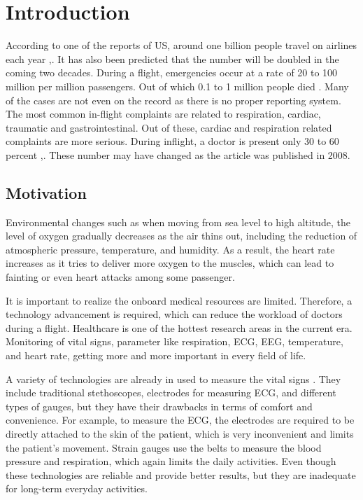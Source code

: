 \chapter{Introduction}

According to one of the reports of US, around one billion people travel on airlines each year \cite{PMC2577402},\cite{aerospace2003medical}. It has also been predicted that the number will be doubled in the coming two decades. During a flight, emergencies occur at a rate of 20 to 100 million per million passengers. Out of which 0.1 to 1 million people died \cite{lyznicki2000inflight}. Many of the cases are not even on the record as there is no proper reporting system. The most common in-flight complaints are related to respiration, cardiac, traumatic and gastrointestinal. Out of these, cardiac and respiration related complaints are more serious. During inflight, a doctor is present only 30 to 60 percent \cite{PMC2577402},\cite{PMC1119071}. These number may have changed as the article was published in 2008.


\section{Motivation}

Environmental changes such as when moving from sea level to high altitude, the level of oxygen gradually decreases as the air thins out, including the reduction of atmospheric pressure, temperature, and humidity. As a result, the heart rate increases as it tries to deliver more oxygen to the muscles, which can lead to fainting or even heart attacks among some passenger.

It is important to realize the onboard medical resources are limited. Therefore, a technology advancement is required, which can reduce the workload of doctors during a flight. Healthcare is one of the hottest research areas in the current era. Monitoring of vital signs, parameter like respiration, ECG, EEG, temperature, and heart rate, getting more and more important in every field of life.

A variety of technologies are already in used to measure the vital signs \cite{naturectlesshcs}. They include traditional stethoscopes, electrodes for measuring ECG, and different types of gauges, but they have their drawbacks in terms of comfort and convenience. For example, to measure the ECG, the electrodes are required to be directly attached to the skin of the patient, which is very inconvenient and limits the patient's movement. Strain gauges use the belts to measure the blood pressure and respiration, which again limits the daily activities. Even though these technologies are reliable and provide better results, but they are inadequate for long-term everyday activities.

